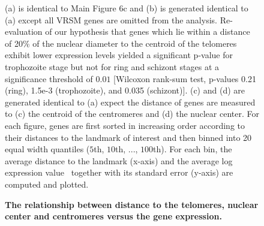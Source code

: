 \documentclass{article}
\begin{document}
\begin{figure}
  \begin{center}
  \hspace{0.05\textwidth}
  \hspace{0.05\textwidth}
  \hspace{0.05\textwidth}
   \end{center}
\caption{{\bf The relationship between distance to the telomeres, nuclear center and centromeres versus the gene expression.}}
{   (a) is identical to Main Figure 6c and (b) is generated identical to (a) except
    all VRSM genes are omitted from the analysis.
    Re-evaluation of our hypothesis that genes which lie within a distance of
    20\% of the nuclear diameter to the centroid of the telomeres exhibit lower expression
    levels yielded a significant p-value for trophozoite stage but not for ring and
    schizont stages at a significance threshold of $0.01$ [Wilcoxon rank-sum test,
    p-values 0.21 (ring), 1.5e-3 (trophozoite), and 0.035 (schizont)].
    (c) and (d) are generated identical to (a) expect the distance of genes are measured to
    (c) the centroid of the centromeres and (d) the nuclear center.
    For each figure, genes are first sorted in increasing order according to their distances
    to the landmark of interest and then binned into 20 equal width quantiles
    ($5$th, $10$th, ..., $100$th). For each bin, the average distance to the landmark (x-axis)
    and the average log expression value~\citep{bunnik:polysome} together with its standard
    error (y-axis) are computed and plotted.
}
\label{suppfig:distToCenter}
\end{figure}
\clearpage
\end{document}
